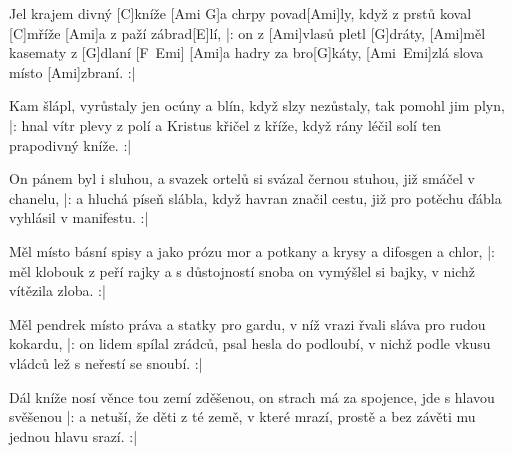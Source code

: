 
\sloka
[Ami]Jel krajem divný [C]kníže [Ami G]a chrpy povad[Ami]ly,
když z prstů koval [C]mříže [Ami]a z paží zábrad[E]lí,
|: on z [Ami]vlasů pletl [G]dráty, [Ami]měl kasematy z [G]dlaní [F\ Emi]
[Ami]a hadry za bro[G]káty, [Ami\ Emi]zlá slova místo [Ami]zbraní. :|

\sloka
Kam šlápl, vyrůstaly jen ocúny a blín,
když slzy nezůstaly, tak pomohl jim plyn,
|: hnal vítr plevy z polí a Kristus křičel z kříže,
když rány léčil solí ten prapodivný kníže. :|

\sloka
On pánem byl i sluhou, a svazek ortelů
si svázal černou stuhou, již smáčel v chanelu,
|: a hluchá píseň slábla, když havran značil cestu,
již pro potěchu ďábla vyhlásil v manifestu. :|

\sloka
Měl místo básní spisy a jako prózu mor
a potkany a krysy a difosgen a chlor,
|: měl klobouk z peří rajky a s důstojností snoba
on vymýšlel si bajky, v nichž vítězila zloba. :|

\sloka
Měl pendrek místo práva a statky pro gardu,
v níž vrazi řvali sláva pro rudou kokardu,
|: on lidem spílal zrádců, psal hesla do podloubí,
v nichž podle vkusu vládců lež s neřestí se snoubí. :|

\sloka
Dál kníže nosí věnce tou zemí zděšenou,
on strach má za spojence, jde s hlavou svěšenou
|: a netuší, že děti z té země, v které mrazí,
prostě a bez závěti mu jednou hlavu srazí. :|
